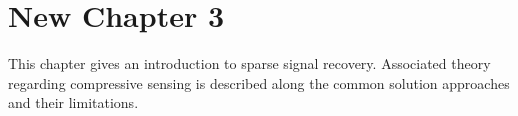 \chapter{New Chapter 3}
This chapter gives an introduction to sparse signal recovery. Associated theory regarding compressive sensing is described along the common solution approaches and their limitations. 
    


